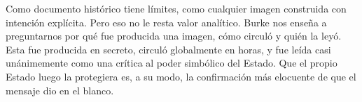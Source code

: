 \documentclass[12pt, a4paper]{article}
\begin{document}
Como documento histórico tiene límites, como cualquier imagen construida con intención explícita. Pero eso no le resta valor analítico. Burke nos enseña a preguntarnos por qué fue producida una imagen, cómo circuló y quién la leyó. Esta fue producida en secreto, circuló globalmente en horas, y fue leída casi unánimemente como una crítica al poder simbólico del Estado. Que el propio Estado luego la protegiera es, a su modo, la confirmación más elocuente de que el mensaje dio en el blanco.

\printbibliography[title={Referencias}]
\end{document}
